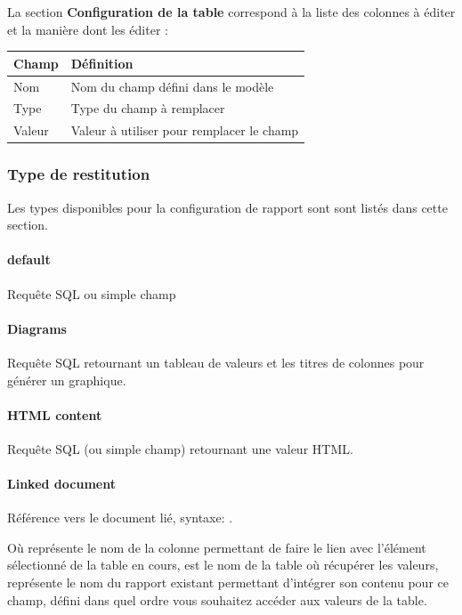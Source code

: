 \documentclass[letterpaper,10pt,english]{sphinxmanual}
\begin{document}
La section \textbf{Configuration de la table} correspond à la liste des
colonnes à éditer et la manière dont les éditer :

\begin{tabulary}{\linewidth}{|L|L|}
\hline

\textbf{Champ}
 & 
\textbf{Définition}
\\
\hline
Nom
 & 
Nom du champ défini dans le modèle
\\
\hline
Type
 & 
Type du champ à remplacer
\\
\hline
Valeur
 & 
Valeur à utiliser pour remplacer le champ
\\
\hline\end{tabulary}



\subsubsection{Type de restitution}
\label{tables/infopanel:type-de-restitution}
Les types disponibles pour la configuration de rapport sont
sont listés dans cette section.


\paragraph{default}
\label{tables/infopanel:default}
Requête SQL ou simple champ


\paragraph{Diagrams}
\label{tables/infopanel:diagrams}
Requête SQL retournant un tableau de valeurs et les titres de colonnes
pour générer un graphique.


\paragraph{HTML content}
\label{tables/infopanel:html-content}
Requête SQL (ou simple champ) retournant une valeur HTML.


\paragraph{Linked document}
\label{tables/infopanel:linked-document}
Référence vers le document lié, syntaxe:
.

Où  représente le nom de la colonne permettant de
faire le lien avec l'élément sélectionné de la table en cours, 
est le nom de la table où récupérer les valeurs, 
représente le nom du rapport existant permettant d'intégrer son
contenu pour ce champ,  défini dans quel ordre vous souhaitez
accéder aux valeurs de la table.
\end{document}
